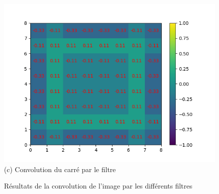 \begin{figure}[h]
        \includegraphics[width=\textwidth]{img/cnn_exemple/square/convolution_filtre_3.png}
        \center 
        (c) Convolution du carré par le filtre 
    \endminipage
    \caption{Résultats de la convolution de l'image par les différents filtres}
\end{figure}


